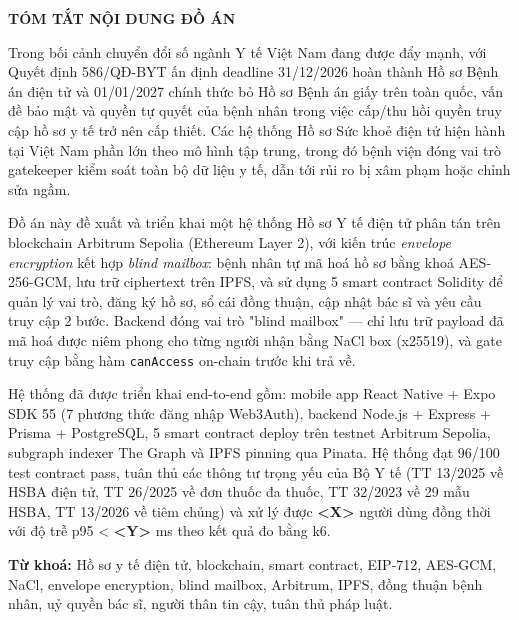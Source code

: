 \documentclass[../DoAn]{subfiles}
\begin{document}
\begin{center}
    \textbf{\Large TÓM TẮT NỘI DUNG ĐỒ ÁN}
\end{center}

\vspace{0.5cm}


Trong bối cảnh chuyển đổi số ngành Y tế Việt Nam đang được đẩy mạnh, với Quyết định 586/QĐ-BYT ấn định deadline 31/12/2026 hoàn thành Hồ sơ Bệnh án điện tử và 01/01/2027 chính thức bỏ Hồ sơ Bệnh án giấy trên toàn quốc, vấn đề bảo mật và quyền tự quyết của bệnh nhân trong việc cấp/thu hồi quyền truy cập hồ sơ y tế trở nên cấp thiết. Các hệ thống Hồ sơ Sức khoẻ điện tử hiện hành tại Việt Nam phần lớn theo mô hình tập trung, trong đó bệnh viện đóng vai trò gatekeeper kiểm soát toàn bộ dữ liệu y tế, dẫn tới rủi ro bị xâm phạm hoặc chỉnh sửa ngầm.

Đồ án này đề xuất và triển khai một hệ thống Hồ sơ Y tế điện tử phân tán trên blockchain Arbitrum Sepolia (Ethereum Layer 2), với kiến trúc \textit{envelope encryption} kết hợp \textit{blind mailbox}: bệnh nhân tự mã hoá hồ sơ bằng khoá AES-256-GCM, lưu trữ ciphertext trên IPFS, và sử dụng 5 smart contract Solidity để quản lý vai trò, đăng ký hồ sơ, sổ cái đồng thuận, cập nhật bác sĩ và yêu cầu truy cập 2 bước. Backend đóng vai trò "blind mailbox" — chỉ lưu trữ payload đã mã hoá được niêm phong cho từng người nhận bằng NaCl box (x25519), và gate truy cập bằng hàm \texttt{canAccess} on-chain trước khi trả về.

Hệ thống đã được triển khai end-to-end gồm: mobile app React Native + Expo SDK 55 (7 phương thức đăng nhập Web3Auth), backend Node.js + Express + Prisma + PostgreSQL, 5 smart contract deploy trên testnet Arbitrum Sepolia, subgraph indexer The Graph và IPFS pinning qua Pinata. Hệ thống đạt 96/100 test contract pass, tuân thủ các thông tư trọng yếu của Bộ Y tế (TT 13/2025 về HSBA điện tử, TT 26/2025 về đơn thuốc đa thuốc, TT 32/2023 về 29 mẫu HSBA, TT 13/2026 về tiêm chủng) và xử lý được \textbf{<X>} người dùng đồng thời với độ trễ p95 < \textbf{<Y>} ms theo kết quả đo bằng k6.

\textbf{Từ khoá:} Hồ sơ y tế điện tử, blockchain, smart contract, EIP-712, AES-GCM, NaCl, envelope encryption, blind mailbox, Arbitrum, IPFS, đồng thuận bệnh nhân, uỷ quyền bác sĩ, người thân tin cậy, tuân thủ pháp luật.
\end{document}
